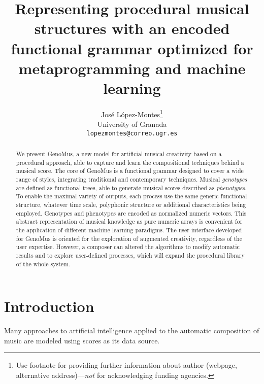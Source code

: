 \documentclass{article}
\title{Representing procedural musical structures with an encoded functional grammar optimized for metaprogramming and machine learning}
\author{
  Jos\'e L\'opez-Montes\thanks{Use footnote for providing further
    information about author (webpage, alternative
    address)---\emph{not} for acknowledging funding agencies.} \\
  University of Granada\\
  \texttt{lopezmontes@correo.ugr.es} \\
}
\begin{document}
\maketitle

\begin{abstract}

 	
We present GenoMus, a new model for artificial musical creativity based on a procedural approach, able to capture and learn the compositional techniques behind a musical score. The core of GenoMus is a functional grammar designed to cover a wide range of styles, integrating traditional and contemporary techniques. Musical \emph{genotypes} are defined as functional trees, able to generate musical scores described as \emph{phenotypes}. To enable the maximal variety of outputs, each process use the same generic functional structure, whatever time scale, polyphonic structure or additional characteristics being employed. Genotypes and phenotypes are encoded as normalized numeric vectors. This abstract representation of musical knowledge as pure numeric arrays is convenient for the application of different machine learning paradigms. The user interface developed for GenoMus is oriented for the exploration of augmented creativity, regardless of the user expertise. However, a composer can altered the algorithms to modify automatic results and to explore user-defined processes, which will expand the procedural library of the whole system.

\end{abstract}





\section{Introduction}

Many approaches to artificial intelligence applied to the automatic composition of music are modeled using scores as its data source.
\end{document}
